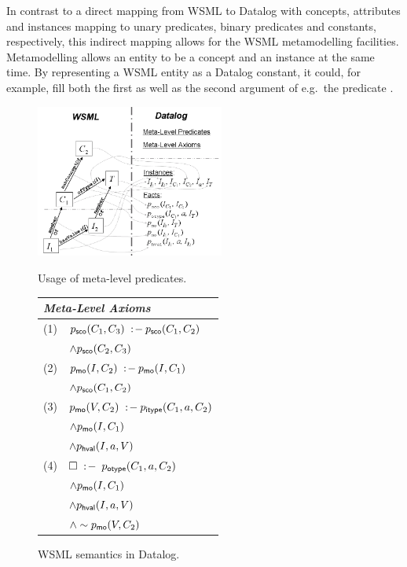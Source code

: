 In contrast to a direct mapping from WSML to Datalog with
concepts, attributes and instances mapping to unary predicates,
binary predicates and constants, respectively, this indirect
mapping allows for the WSML metamodelling facilities.
Metamodelling allows an entity to be a concept and an instance at
the same time. By representing a WSML entity as a Datalog
constant, it could, for example, fill both the first as well as
the second argument of e.g.\ the predicate \pmo.

\begin{figure}[tb]
\begin{minipage}[t]{6cm}
        \includegraphics[width=6.2cm]{figures/meta}
        \raggedleft
\vspace{-6mm}\caption{Usage of meta-level predicates.
\label{fig:meta}}
\end{minipage}\hfill
\begin{minipage}[t]{4.7cm}
\begin{small}
\vspace{-4.8cm}
\begin{tabular}{|ll|}
  \hline
  \multicolumn{2}{|l|}{\rule{0cm}{3.2mm}{\normalsize \emph{Meta-Level Axioms}}} \\
  \hline
  (1) & $p_{\mathrm{\sf sco}}(C_1,C_3) \;:\!-\: p_{\mathrm{\sf sco}}(C_1,C_2)$ \\
      & \phantom{$\psco(C_1,C_3) \dlogrule$} $\wedge p_{\mathrm{\sf sco}}(C_2,C_3)$ \\
  (2) & $p_{\mathrm{\sf mo}}(I,C_2) \;:\!-\: p_{\mathrm{\sf mo}}(I,C_1)$ \\
      & \phantom{$\pmo(I,C_2) \dlogrule$} $\wedge p_{\mathrm{\sf sco}}(C_1,C_2)$ \\
  (3) & $p_{\mathrm{\sf mo}}(V,C_2) \;:\!-\: p_{\mathrm{\sf itype}}(C_1,a,C_2)$ \\
      & \phantom{$\pmo(V,C_2) \dlogrule$} $\wedge p_{\mathrm{\sf mo}}(I,C_1)$ \\
      & \phantom{$\pmo(V,C_2) \dlogrule$} $\wedge p_{\mathrm{\sf hval}}(I,a,V)$ \\
  (4) & $\square\;:\!-\: \; p_{\mathrm{\sf otype}}(C_1,a,C_2)$ \\
      & \phantom{$\dlogcstr \;$} $\wedge p_{\mathrm{\sf mo}}(I,C_1)$ \\
      & \phantom{$\dlogcstr \;$} $\wedge p_{\mathrm{\sf hval}}(I,a,V)$ \\
      & \phantom{$\dlogcstr \;$} $\wedge \sim p_{\mathrm{\sf mo}}(V,C_2)$ \\
 \hline
\end{tabular}
\caption{WSML semantics in Datalog. \label{tab:meta-level}}
\end{small}
\end{minipage}\vspace{-2mm}
\end{figure}

